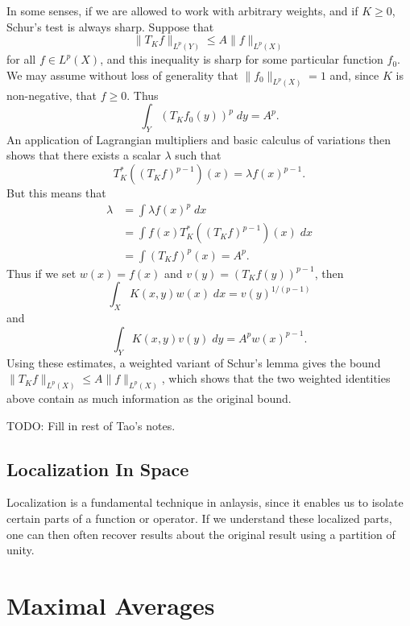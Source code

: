 In some senses, if we are allowed to work with arbitrary weights, and if $K \geq 0$, Schur's test is always sharp. Suppose that
%
\[ \| T_K f \|_{L^p(Y)} \leq A \| f \|_{L^p(X)} \]
%
for all $f \in L^p(X)$, and this inequality is sharp for some particular function $f_0$. We may assume without loss of generality that $\| f_0 \|_{L^p(X)} = 1$ and, since $K$ is non-negative, that $f \geq 0$. Thus
%
\[ \int_Y (T_K f_0(y))^p\; dy = A^p. \]
%
An application of Lagrangian multipliers and basic calculus of variations then shows that there exists a scalar $\lambda$ such that
%
\[ T_K^*((T_K f)^{p-1})(x) = \lambda f(x)^{p-1}. \]
%
But this means that
%
\begin{align*}
  \lambda &= \int \lambda f(x)^p\; dx\\
  &= \int f(x)T_K^*((T_K f)^{p-1})(x)\; dx\\
  &= \int (T_K f)^p(x) = A^p.
\end{align*}
%
Thus if we set $w(x) = f(x)$ and $v(y) = (T_K f(y))^{p-1}$, then
%
\[ \int_X K(x,y) w(x)\; dx = v(y)^{1/(p-1)} \]
%
and
%
\[ \int_Y K(x,y) v(y)\; dy = A^p w(x)^{p-1}. \]
%
Using these estimates, a weighted variant of Schur's lemma gives the bound $\| T_K f \|_{L^p(X)} \leq A \| f \|_{L^p(X)}$, which shows that the two weighted identities above contain as much information as the original bound.

TODO: Fill in rest of Tao's notes.











\section{Localization In Space}

Localization is a fundamental technique in anlaysis, since it enables us to isolate certain parts of a function or operator. If we understand these localized parts, one can then often recover results about the original result using a partition of unity.











\chapter{Maximal Averages}

